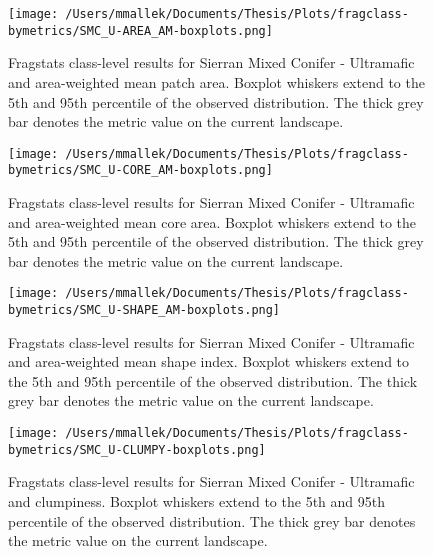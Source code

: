 \begin{figure}[!htbp]
\centering
    \texttt{[image: /Users/mmallek/Documents/Thesis/Plots/fragclass-bymetrics/SMC\_U-AREA\_AM-boxplots.png]}
  \caption{Fragstats class-level results for Sierran Mixed Conifer - Ultramafic and area-weighted mean patch area. Boxplot whiskers extend to the 5th and 95th percentile of the observed distribution. The thick grey bar denotes the metric value on the current landscape.}
  \label{fig:smcu_areaam}
\end{figure}


\begin{figure}[!htbp]
\centering
    \texttt{[image: /Users/mmallek/Documents/Thesis/Plots/fragclass-bymetrics/SMC\_U-CORE\_AM-boxplots.png]}
  \caption{Fragstats class-level results for Sierran Mixed Conifer - Ultramafic and area-weighted mean core area. Boxplot whiskers extend to the 5th and 95th percentile of the observed distribution. The thick grey bar denotes the metric value on the current landscape.}
  \label{fig:smcu_coream}
\end{figure}


\begin{figure}[!htbp]
\centering
    \texttt{[image: /Users/mmallek/Documents/Thesis/Plots/fragclass-bymetrics/SMC\_U-SHAPE\_AM-boxplots.png]}
  \caption{Fragstats class-level results for Sierran Mixed Conifer - Ultramafic and area-weighted mean shape index. Boxplot whiskers extend to the 5th and 95th percentile of the observed distribution. The thick grey bar denotes the metric value on the current landscape.}
  \label{fig:smcu_shapeam}
\end{figure}


\begin{figure}[!htbp]
\centering
    \texttt{[image: /Users/mmallek/Documents/Thesis/Plots/fragclass-bymetrics/SMC\_U-CLUMPY-boxplots.png]}
  \caption{Fragstats class-level results for Sierran Mixed Conifer - Ultramafic and clumpiness. Boxplot whiskers extend to the 5th and 95th percentile of the observed distribution. The thick grey bar denotes the metric value on the current landscape.}
  \label{fig:smcu_clumpy}
\end{figure}




